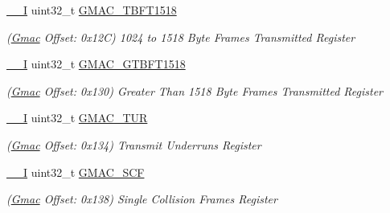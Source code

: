 \begin{DoxyCompactItemize}
\mbox{\label{structGmac_a3bfd40e9b5a479634cbf2337b11b1327}} 
\mbox{\hyperlink{core__cm7_8h_af63697ed9952cc71e1225efe205f6cd3}{\+\_\+\+\_\+I}} uint32\+\_\+t \mbox{\hyperlink{structGmac_a3bfd40e9b5a479634cbf2337b11b1327}{G\+M\+A\+C\+\_\+\+T\+B\+F\+T1518}}
\begin{DoxyCompactList}\small\item\em (\mbox{\hyperlink{structGmac}{Gmac}} Offset\+: 0x12C) 1024 to 1518 Byte Frames Transmitted Register \end{DoxyCompactList}\item 
\mbox{\label{structGmac_ad343460422ee03aeb505b18fc3fddeaf}} 
\mbox{\hyperlink{core__cm7_8h_af63697ed9952cc71e1225efe205f6cd3}{\+\_\+\+\_\+I}} uint32\+\_\+t \mbox{\hyperlink{structGmac_ad343460422ee03aeb505b18fc3fddeaf}{G\+M\+A\+C\+\_\+\+G\+T\+B\+F\+T1518}}
\begin{DoxyCompactList}\small\item\em (\mbox{\hyperlink{structGmac}{Gmac}} Offset\+: 0x130) Greater Than 1518 Byte Frames Transmitted Register \end{DoxyCompactList}\item 
\mbox{\label{structGmac_ad4278b1a2a3f662e8f7b96b6eea98e4a}} 
\mbox{\hyperlink{core__cm7_8h_af63697ed9952cc71e1225efe205f6cd3}{\+\_\+\+\_\+I}} uint32\+\_\+t \mbox{\hyperlink{structGmac_ad4278b1a2a3f662e8f7b96b6eea98e4a}{G\+M\+A\+C\+\_\+\+T\+UR}}
\begin{DoxyCompactList}\small\item\em (\mbox{\hyperlink{structGmac}{Gmac}} Offset\+: 0x134) Transmit Underruns Register \end{DoxyCompactList}\item 
\mbox{\label{structGmac_ae72d7f5be7854ae4e2ae0cf3a1d4516a}} 
\mbox{\hyperlink{core__cm7_8h_af63697ed9952cc71e1225efe205f6cd3}{\+\_\+\+\_\+I}} uint32\+\_\+t \mbox{\hyperlink{structGmac_ae72d7f5be7854ae4e2ae0cf3a1d4516a}{G\+M\+A\+C\+\_\+\+S\+CF}}
\begin{DoxyCompactList}\small\item\em (\mbox{\hyperlink{structGmac}{Gmac}} Offset\+: 0x138) Single Collision Frames Register \end{DoxyCompactList}\item 
\mbox{\label{structGmac_a065024165993ba2242abcb9826b86aaf}} 

\end{DoxyCompactItemize}
